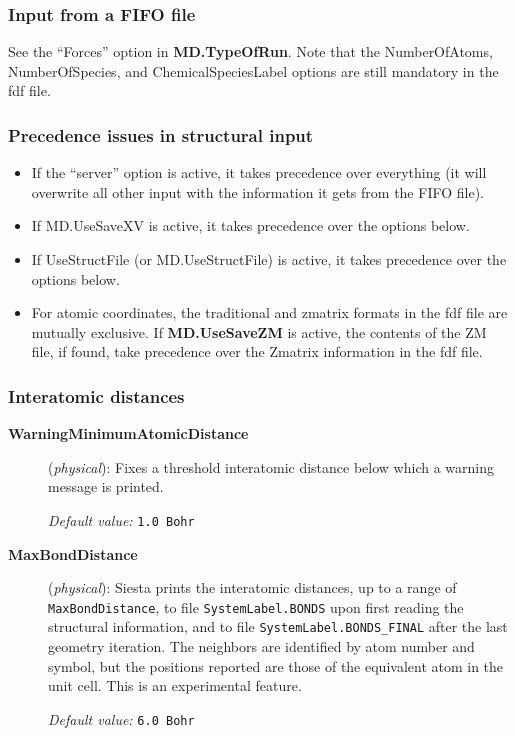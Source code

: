 \documentclass[11pt]{article}
\begin{document}
\subsubsection{Input from a FIFO file}

See the ``Forces'' option in {\bf MD.TypeOfRun}.
Note that the NumberOfAtoms, NumberOfSpecies, and ChemicalSpeciesLabel
options are still mandatory in the fdf file.

\subsubsection{Precedence issues in structural input}

\begin{itemize}
\item If the ``server'' option is active, it takes precedence over
everything (it will overwrite all other input with the information it
gets from the FIFO file).

\item If MD.UseSaveXV is active, it takes precedence over the options below.

\item If UseStructFile (or MD.UseStructFile) is active, it takes precedence
over the options below.

\item For atomic coordinates, the traditional and zmatrix formats in
  the fdf file are mutually exclusive. If {\bf MD.UseSaveZM} is
  active, the contents of the ZM file, if found, take precedence over
  the Zmatrix information in the fdf file.

\end{itemize}

\subsubsection{Interatomic distances}

\begin{description}
\item[{\bf WarningMinimumAtomicDistance}] ({\it physical}): 
Fixes a threshold interatomic distance below which a warning
message is printed.

{\it Default value:} {\tt 1.0 Bohr}

\item[{\bf MaxBondDistance}] ({\it physical}): 
{\sc Siesta} prints the interatomic
distances, up to
a range of {\tt MaxBondDistance}, to file 
{\tt SystemLabel.BONDS} upon first
reading the structural information, and to file
{\tt SystemLabel.BONDS\_FINAL}
after the last geometry iteration. The neighbors are identified by
atom number and symbol, but the positions reported are those of the
equivalent atom in the unit cell. This is an experimental feature.

{\it Default value:} {\tt 6.0 Bohr}

\end{description}
\end{document}
